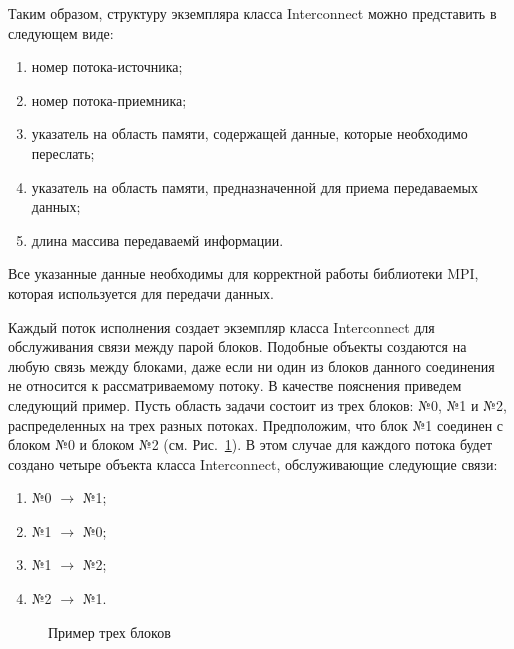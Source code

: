 \documentclass[a4paper, 14pt]{extarticle}
\theoremstyle{definition}
\begin{document}
\par Таким образом, структуру экземпляра класса Interconnect можно представить в следующем виде:
\begin{enumerate}
\item номер потока-источника;
\item номер потока-приемника;
\item указатель на область памяти, содержащей данные, которые необходимо переслать;
\item указатель на область памяти, предназначенной для приема передаваемых данных;
\item длина массива передаваемй информации.
\end{enumerate}

\par Все указанные данные необходимы для корректной работы библиотеки MPI, которая используется для передачи данных.

\par Каждый поток исполнения создает экземпляр класса Interconnect для обслуживания связи между парой блоков. Подобные объекты создаются на любую связь между блоками, даже если ни один из блоков данного соединения не относится к рассматриваемому потоку. В качестве пояснения приведем следующий пример. Пусть область задачи состоит из трех блоков: №0, №1 и №2, распределенных на трех разных потоках. Предположим, что блок №1 соединен с блоком №0 и блоком №2 (см. Рис.~\ref{ris:3Block_ex}). В этом случае для каждого потока будет создано четыре объекта класса Interconnect, обслуживающие следующие связи:
\begin{enumerate}
\item {№0 $\to$ №1};
\item {№1 $\to$ №0};
\item {№1 $\to$ №2};
\item {№2 $\to$ №1}.
\end{enumerate}

\begin{figure}[h]
	\caption{Пример трех блоков}
	\label{ris:3Block_ex}
\end{figure}
\end{document}
